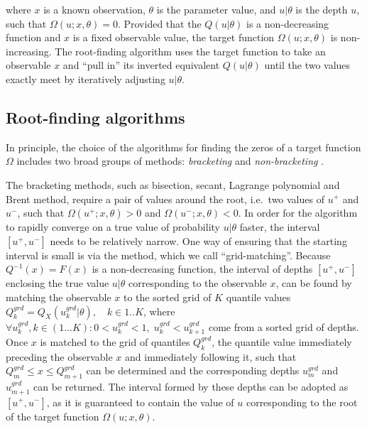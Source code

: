 \documentclass[
  12pt,
]{article}
\begin{document}
where \(x\) is a known observation, \(\theta\) is the parameter value, and \(u|\theta\) is the depth \(u\), such that \(\Omega(u;x,\theta)=0\). Provided that the \(Q(u|\theta)\) is a non-decreasing function and \(x\) is a fixed observable value, the target function \(\Omega(u;x,\theta)\) is non-increasing. The root-finding algorithm uses the target function to take an observable \(x\) and ``pull in'' its inverted equivalent \(Q(u|\theta)\) until the two values exactly meet by iteratively adjusting \(u|\theta\).

\hypertarget{root-finding-algorithms}{%
\subsection{Root-finding algorithms}\label{root-finding-algorithms}}

In principle, the choice of the algorithms for finding the zeros of a target function \(\Omega\) includes two broad groups of methods: \emph{bracketing} and \emph{non-bracketing} \citep{atkinson2008IntroductionNumericalAnalysis, burden2011NumericalAnalysis}.

The bracketing methods, such as bisection, secant, Lagrange polynomial and Brent method, require a pair of values around the root, i.e.~two values of \(u^+\) and \(u^-\), such that \(\Omega(u^+;x,\theta)>0\) and \(\Omega(u^-;x,\theta)<0\). In order for the algorithm to rapidly converge on a true value of probability \(u|\theta\) faster, the interval \([u^+, u^-]\) needs to be relatively narrow. One way of ensuring that the starting interval is small is via the method, which we call ``grid-matching''. Because \(Q^{-1}(x)=F(x)\) is a non-decreasing function, the interval of depths \([u^+, u^-]\) enclosing the true value \(u|\theta\) corresponding to the observable \(x\), can be found by matching the observable \(x\) to the sorted grid of \(K\) quantile values \(Q^{grd}_k=Q_X(u^{grd}_k|\theta), \quad k \in 1..K\), where \(\forall u^{grd}_k, k \in (1\dots K): 0<u^{grd}_k<1, \; u^{grd}_k<u^{grd}_{k+1}\) come from a sorted grid of depths. Once \(x\) is matched to the grid of quantiles \(Q^{grd}_k\), the quantile value immediately preceding the observable \(x\) and immediately following it, such that \(Q^{grd}_{m} \leq x \leq Q^{grd}_{m+1}\) can be determined and the corresponding depths \(u^{grd}_m\) and \(u^{grd}_{m+1}\) can be returned. The interval formed by these depths can be adopted as \([u^+, u^-]\), as it is guaranteed to contain the value of \(u\) corresponding to the root of the target function \(\Omega(u;x,\theta)\).
\end{document}
